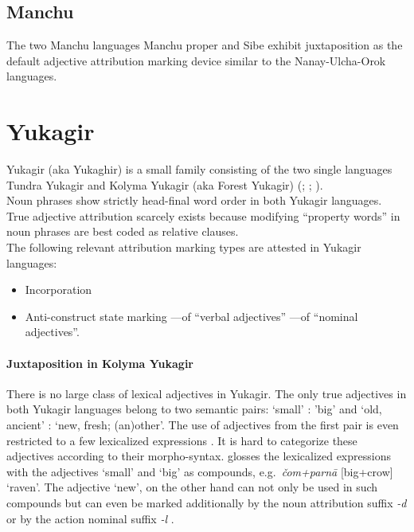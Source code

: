 \subsection{Manchu}
The two Manchu languages Manchu proper and Sibe exhibit juxtaposition as the default adjective attribution marking device similar to the Nanay-Ulcha-Orok languages.

\section{Yukagir} \label{yukagir synchr}
Yukagir (aka Yukaghir) is a small family consisting of the two single languages Tundra Yukagir and Kolyma Yukagir (aka Forest Yukagir)  (\citealt[223]{salminen2007}; \citealt[1–2]{maslova2003a}; \citealt[1]{maslova2003b}).\\

\noindent Noun phrases show strictly head-final word order in both Yukagir languages. True adjective attribution scarcely exists because modifying “property words” in noun phrases are best coded as relative clauses.\\

\noindent The following relevant attribution marking types are attested in Yukagir languages:
\begin{itemize}
\item Incorporation
\item Anti-construct state marking
	\subitem —of “verbal adjectives”
	\subitem —of “nominal adjectives”.
\end{itemize}

\paragraph{Juxtaposition in Kolyma Yukagir}
There is no large class of lexical adjectives in Yukagir. The only true adjectives in both Yukagir languages belong to two semantic pairs: ‘small’ : ’big’ and ‘old, ancient’ : ‘new, fresh; (an)other’. The use of adjectives from the first pair is even restricted to a few lexicalized expressions \cite[70–71]{maslova2003b}. It is hard to categorize these adjectives according to their morpho-syntax. \citet[71]{maslova2003b} glosses the lexicalized expressions with the adjectives ‘small’ and ‘big’ as compounds, e.g.~\textit{čom+parnā} [big+crow] ‘raven’. The adjective ‘new’, on the other hand can not only be used in such compounds but can even be marked additionally by the noun attribution suffix \textit{-d} or by the action nominal suffix \textit{-l} \cite[71]{maslova2003b}.

